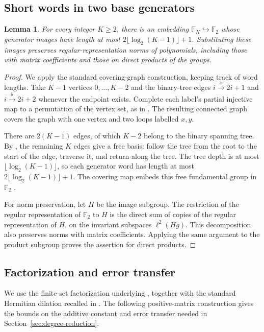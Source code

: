 \documentclass[11pt]{article}
\numberwithin{equation}{section}
\newtheorem{lemma}[theorem]{Lemma}
\theoremstyle{boldremark}\newtheorem{remark}[theorem]{Remark}
\newcommand{\F}{\mathbb F}
\begin{document}
\subsection{Short words in two base generators}

\begin{lemma}\label{lem:embedding}
For every integer $K\ge2$, there is an embedding
$\F_K\hookrightarrow\F_2$ whose generator images have length at most
$2\lfloor\log_2(K-1)\rfloor+1$.
Substituting these images preserves regular-representation norms of
polynomials, including those with matrix coefficients and those on
direct products of the groups.
\end{lemma}
\begin{proof}
We apply the standard covering-graph construction, keeping track of
word lengths. Take $K-1$ vertices $0,\ldots,K-2$ and the binary-tree
edges $i\xrightarrow{x}2i+1$ and $i\xrightarrow{y}2i+2$ whenever the
endpoint exists. Complete each label's partial injective map to a
permutation of the vertex set, as in
\cite[Theorem~6.1]{Stallings}. The resulting connected graph covers
the graph with one vertex and two loops labelled $x,y$.

There are $2(K-1)$ edges, of which $K-2$ belong to the binary spanning
tree. By \cite[Proposition~1A.2]{Hatcher}, the remaining $K$ edges give
a free basis: follow the tree from the root to the start of the edge,
traverse it, and return along the tree. The tree depth is at most
$\lfloor\log_2(K-1)\rfloor$, so each generator word has length at most
$2\lfloor\log_2(K-1)\rfloor+1$. The covering map embeds this free
fundamental group in $\F_2$ \cite[Proposition~1.31]{Hatcher}.

For norm preservation, let $H$ be the image subgroup. The restriction
of the regular representation of $\F_2$ to $H$ is the direct sum of
copies of the regular representation of $H$, on the invariant
subspaces $\ell^2(Hg)$. This decomposition also preserves norms with
matrix coefficients. Applying the same argument to the product
subgroup proves the assertion for direct products.
\end{proof}

\subsection{Factorization and error transfer}

We use the finite-set factorization underlying
\cite[Lemma~8.1]{BC}, together with the standard Hermitian dilation
recalled in \cite[Remark~7.4]{Pisier14}.
The following positive-matrix construction gives the bounds on the
additive constant and error transfer needed in
Section~\ref{sec:degree-reduction}.
\end{document}
